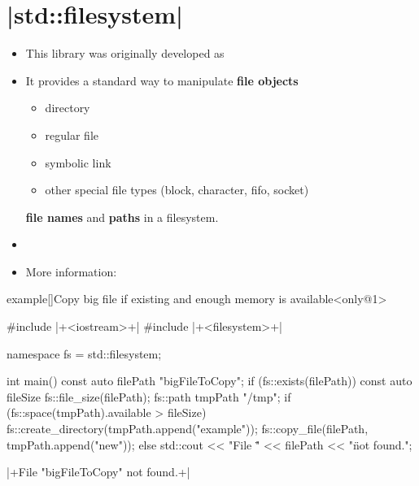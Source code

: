 \section{\CPP|std::filesystem|}
\begin{frame}[fragile]{\insertsectionhead}
    \vspace{-3mm}
    \begin{itemize}
        \item This library was originally developed as 
        \item It provides a standard way to manipulate \textbf{file objects}
              \begin{itemize}
                  \item directory
                  \item regular file
                  \item symbolic link
                  \item other special file types (block, character, fifo, socket)
              \end{itemize}
              \textbf{file names} and \textbf{paths} in a filesystem.
        \item {}
        \item More information: 
    \end{itemize}
\end{frame}
\begin{frame}[fragile]{}
    \begin{varblock}{example}[\textwidth]{Copy big file if existing and enough memory is available}<only@1>
        \begin{Cpp}
            #include |+<iostream>+|
            #include |+<filesystem>+|

            namespace fs = std::filesystem;

            int main()
            {
                const auto filePath {"bigFileToCopy"};
                if (fs::exists(filePath)) {
                    const auto fileSize {fs::file_size(filePath)};
                    fs::path tmpPath {"/tmp"};
                    if (fs::space(tmpPath).available > fileSize)
                    {
                        fs::create_directory(tmpPath.append("example"));
                        fs::copy_file(filePath, tmpPath.append("new"));
                    }
                } else
                std::cout << "File \"" << filePath << "\" not found.\n";
            }
        \end{Cpp}
        \begin{Bash}[numbers=none]
            |+File "bigFileToCopy" not found.+|
        \end{Bash}
    \end{varblock}
\end{frame}

